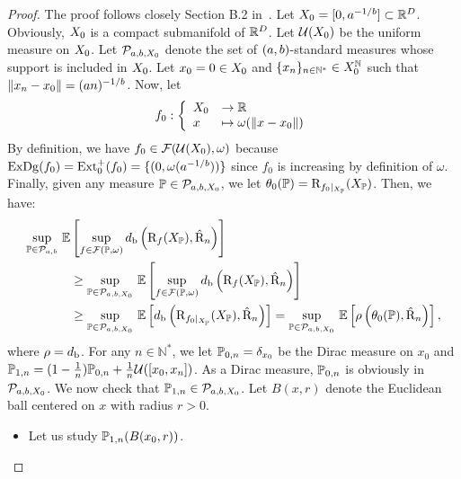 \begin{proof}
The proof follows closely Section B.2 in~\cite{Chazal13c}.
Let $X_0=[0,a^{-1/b}]\subset\mathbb{R}^D$.
Obviously, $X_0$ is a compact submanifold of $\mathbb{R}^D$. Let $\mathcal U(X_0)$ be the uniform measure on $X_0$. 
Let $\mathcal P_{a,b,X_0}$ denote
the set of $(a,b)$-standard measures whose support is included in $X_0$.
Let $x_0=0\in X_0$ and $\{x_n\}_{n\in\mathbb{N}^*}\in X_0^{\mathbb{N}}$ such that $\|x_n-x_0\|=(an)^{-1/b}$.
Now, let $$f_0:\left\{\begin{array}{ll} X_0 & \rightarrow\mathbb{R} \\ x & \mapsto \omega(\|x-x_0\|) \end{array} \right.$$ 
By definition, we have $f_0\in\mathcal F(\mathcal U(X_0),\omega)$ because $\mathrm{ExDg}(f_0)=\mathrm{Ext}_0^+(f_0)=\{(0,\omega(a^{-1/b}))\}$
since $f_0$ is increasing by definition of $\omega$.
Finally, given any measure $\mathbb{P}\in\mathcal{P}_{a,b,X_0}$, we let $\theta_0(\mathbb{P})=\mathrm{R}_{f_0|_{X_{\mathbb{P}}}}(X_{\mathbb{P}})$.
Then, we have:
\begin{align}
\underset{\mathbb{P}\in\mathcal{P}_{a,b}}{\rm sup}\  \mathbb{E}&\left[\sup_{f \in \mathcal F(\mathbb{P},\omega) }d_{\rm b}\left(\mathrm{R}_f(X_{\mathbb{P}}),{\hat {\mathrm{R}}}_n \right)\right] \nonumber\\
&\geq \underset{\mathbb{P}\in\mathcal{P}_{a,b,X_0}}{\rm sup}\  \mathbb{E}\left[\sup_{f \in \mathcal F(\mathbb{P},\omega) }d_{\rm b}\left(\mathrm{R}_f(X_{\mathbb{P}}),{\hat {\mathrm{R}}}_n \right)\right] \nonumber\\
&\geq \underset{\mathbb{P}\in\mathcal{P}_{a,b,X_0}}{\rm sup}\  \mathbb{E}\left[d_{\rm b}\left(\mathrm{R}_{f_0|_{X_{\mathbb{P}}}}(X_{\mathbb{P}}),{\hat {\mathrm{R}}}_n \right)\right]
= \underset{\mathbb{P}\in\mathcal{P}_{a,b,X_0}}{\rm sup}\  \mathbb{E}\left[\rho\left(\theta_0(\mathbb{P}),{\hat {\mathrm{R}}}_n \right)\right], \nonumber
\end{align}
where $\rho=d_{\rm b}$. For any $n\in\mathbb{N}^*$, we let $\mathbb{P}_{0,n}=\delta_{x_0}$ be the Dirac measure on $x_0$ and 
$\mathbb{P}_{1,n}=(1 - \frac 1 n) \mathbb{P}_{0,n} + \frac 1 n \mathcal{U}([x_0, x_n])$.
As a Dirac measure, $\mathbb{P}_{0,n}$ is obviously in $\mathcal P_{a,b,X_0}$.
We now check that $\mathbb{P}_{1,n}\in\mathcal P_{a,b,X_0}$.
Let $B(x,r)$ denote the Euclidean ball centered on $x$ with radius $r>0$. %
\begin{itemize}
\item Let us study $\mathbb{P}_{1,n}(B(x_0,r))$. 


\end{itemize}
\end{proof}
